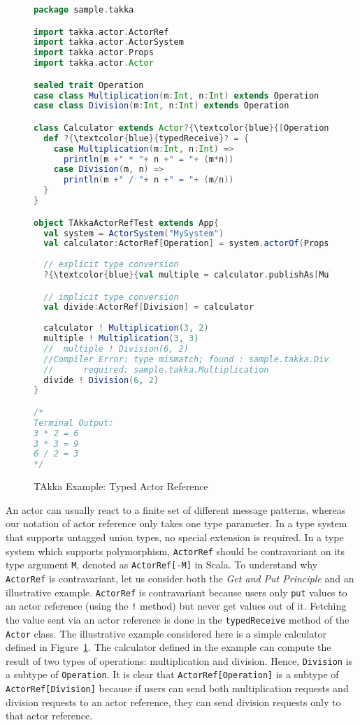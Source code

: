 \begin{figure}[p]
\begin{lstlisting}[language=scala,  escapechar=?]
package sample.takka

import takka.actor.ActorRef
import takka.actor.ActorSystem
import takka.actor.Props
import takka.actor.Actor

sealed trait Operation
case class Multiplication(m:Int, n:Int) extends Operation
case class Division(m:Int, n:Int) extends Operation

class Calculator extends Actor?{\textcolor{blue}{[Operation]}? {
  def ?{\textcolor{blue}{typedReceive}? = {
    case Multiplication(m:Int, n:Int) =>
      println(m +" * "+ n +" = "+ (m*n))    
    case Division(m, n) =>
      println(m +" / "+ n +" = "+ (m/n))
  }
}

object TAkkaActorRefTest extends App{
  val system = ActorSystem("MySystem")
  val calculator:ActorRef[Operation] = system.actorOf(Props[?{\textcolor{blue}{Operation}?, Calculator], "calculator")
  
  // explicit type conversion 
  ?{\textcolor{blue}{val multiple = calculator.publishAs[Multiplication]}?

  // implicit type conversion 
  val divide:ActorRef[Division] = calculator  
  
  calculator ! Multiplication(3, 2)
  multiple ! Multiplication(3, 3)
  //  multiple ! Division(6, 2)  
  //Compiler Error: type mismatch; found : sample.takka.Division
  //	  required: sample.takka.Multiplication
  divide ! Division(6, 2)  
}

/*
Terminal Output:
3 * 2 = 6
3 * 3 = 9
6 / 2 = 3
*/
\end{lstlisting}
\caption{TAkka Example: Typed Actor Reference}
\label{takka_actor_reference_example}
\end{figure}


An actor can usually react to a finite set of different message patterns, 
whereas our notation of actor reference only takes one type parameter.  In a 
type system that supports untagged union types, no special extension is
required.  In a type system which supports polymorphism, {\tt ActorRef} should
be contravariant on its type argument {\tt M}, denoted as {\tt ActorRef[-M]} in 
Scala.  To understand why {\tt ActorRef} is contravariant, let us consider both the 
{\it Get and Put Principle} and an illustrative example.   {\tt ActorRef} is 
contravariant because users only {\tt put} values to an actor reference (using the {\tt !} method) but 
never get values out of it.  Fetching the value sent via an actor reference is done
in the {\tt typedReceive} method of the {\tt Actor} class.  The illustrative example considered here is a 
simple calculator defined in Figure~\ref{takka_actor_reference_example}.
The calculator defined in the example can compute the result of two types of 
operations: multiplication and division.  Hence, {\tt Division} is a 
subtype of {\tt Operation}. It is clear that {\tt ActorRef[Operation]} is a 
subtype of {\tt ActorRef[Division]} because if users can send both 
multiplication requests and division requests to an actor reference, they can 
send division requests only to that actor reference.

